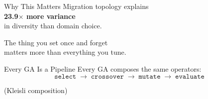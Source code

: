 \documentclass[aspectratio=169,14pt]{beamer}
\begin{document}
\begin{frame}{Why This Matters}
  \vspace{10pt}
  {\large Migration topology explains}\\[10pt]
  {\LARGE\bfseries\color{geccoHighlight} 23.9$\times$ more variance}\\[10pt]
  {\large in diversity than domain choice.}
  \vspace{20pt}

  {\color{gray}
    The thing you set once and forget\\
    matters more than everything you tune.}
\end{frame}

\begin{frame}[fragile]{Every GA Is a Pipeline}
  Every GA composes the same operators:
  \[
    \texttt{select} \;\to\; \texttt{crossover} \;\to\; \texttt{mutate} \;\to\; \texttt{evaluate}
  \]

  \vspace{10pt}
 \alert{(Kleisli composition)}

\end{frame}
\end{document}
